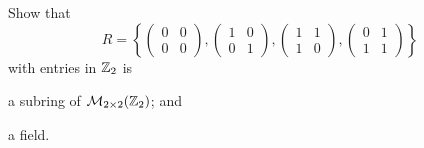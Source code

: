 \begin{problem}
    Show that
    \[
        R = \left\{\begin{pmatrix}0&0\\0&0\end{pmatrix},\begin{pmatrix}1&0\\0&1\end{pmatrix},\begin{pmatrix}1&1\\1&0\end{pmatrix},\begin{pmatrix}0&1\\1&1\end{pmatrix}\right\}
    \]
    with entries in $\mathbb{Z}_2$ is
    \begin{partquestions}{\roman*}
        \item a subring of $\mathcal{M}_{2\times2}(\mathbb{Z}_2)$; and
        \item a field.
    \end{partquestions}
\end{problem}
